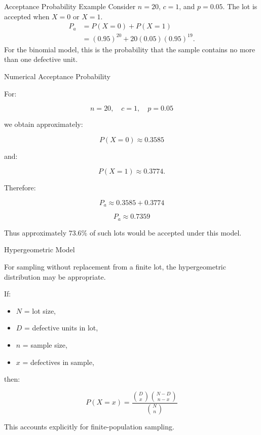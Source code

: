 \documentclass[aspectratio=169,10pt]{beamer}
\begin{document}

\begin{frame}{Acceptance Probability Example}
\small
Consider $n=20$, $c=1$, and $p=0.05$. The lot is accepted when $X=0$ or $X=1$.
\begin{align*}
P_a&=P(X=0)+P(X=1)\\
&=(0.95)^{20}+20(0.05)(0.95)^{19}.
\end{align*}
For the binomial model, this is the probability that the sample contains no more than one defective unit.
\end{frame}


\begin{frame}[shrink=18]{Numerical Acceptance Probability}
\small

For:

\[
n=20,\quad c=1,\quad p=0.05
\]

we obtain approximately:

\[
P(X=0)\approx0.3585
\]

and:

\[
P(X=1)\approx0.3774.
\]

Therefore:

\[
P_a
\approx
0.3585+0.3774
\]

\[
\boxed{
P_a\approx0.7359
}
\]

Thus approximately \(73.6\%\) of such lots would be accepted
under this model.

\end{frame}


\begin{frame}[shrink=18]{Hypergeometric Model}
\small

For sampling without replacement from a finite lot, the
hypergeometric distribution may be appropriate.

If:

\begin{itemize}
    \item \(N\) = lot size,
    \item \(D\) = defective units in lot,
    \item \(n\) = sample size,
    \item \(x\) = defectives in sample,
\end{itemize}

then:

\[
\boxed{
P(X=x)
=
\frac{
{D\choose x}
{N-D\choose n-x}
}{
{N\choose n}
}
}
\]

This accounts explicitly for finite-population sampling.

\end{frame}
\end{document}
